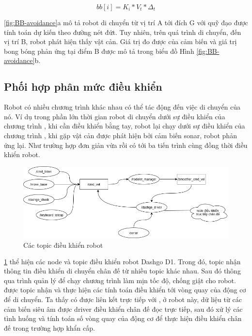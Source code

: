\begin{equation}
    bb[i] = K_i*V_t*\Delta_t
    \label{equa:BB-update}
\end{equation}

\figurename{ \ref{fig:BB-avoidance}}a mô tả robot di chuyển từ vị trí A tới đích G với quỹ đạo được tính toán dự kiến theo đường nét đứt. Tuy nhiên, trên quá trình di chuyển, đến vị trí B, robot phát hiện thấy vật cản. Giá trị đo được của cảm biến và giá trị bong bóng phản ứng tại điểm B được mô tả trong biểu đồ Hình \ref{fig:BB-avoidance}b.

\subsection{Phối hợp phân mức điều khiển}
Robot có nhiều chương trình khác nhau có thể tác động đến việc di chuyển của nó. Ví dụ trong phần lớn thời gian robot di chuyển dưới sự điều khiển của chương trình , khi cần điều khiển bằng tay, robot lại chạy dưới sự điều khiển của chương trình , khi gặp vật cản được phát hiện bởi cảm biến sonar, robot phản ứng lại. Như trường hợp đơn giản vừa rồi có tới ba tiến trình cùng đồng thời điều khiển robot.

\begin{figure}[htbp]
    \centering
    \includegraphics[width=\linewidth]{figures/phanquyen-goc.png}
    \caption{Các topic điều khiển robot}
    \label{fig:phanquyen-goc}
\end{figure}

\figurename{ \ref{fig:phanquyen-goc}} thể hiện các node và topic điều khiển robot Dashgo D1. Trong đó, topic  nhận thông tin điều khiển di chuyển chân đế từ nhiều topic khác nhau. Sau đó thông qua trình quản lý  để chạy chương trình làm mịn tốc độ, chống giật cho robot.  được topic  nhận và thực hiện các tính toán điều khiển tới vòng quay của động cơ để di chuyển.
Ta thấy có  được liên kết trực tiếp với , ở robot này, dữ liệu từ các cảm biến siêu âm được driver điều khiển chân đế đọc trực tiếp, sau đó xử lý các tình huống và tính toán số vòng quay của động cơ để thực hiện điều khiển chân đế trong trường hợp khẩn cấp.

